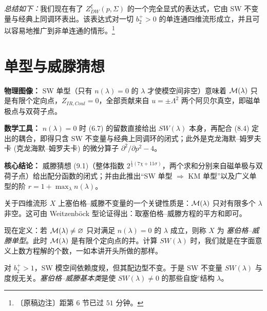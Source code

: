 \emph{总结如下：}我们现在有了 $Z_{DW}^{\xi}(p,\Sigma)$ 的一个完全显式的表达式，它由 SW 不变量与经典上同调环表出。该表达式对一切 $b_2^{+}>0$ 的单连通四维流形成立，并且可以容易地推广到非单连通的情形。\footnote{〔原稿边注〕距第 6 节已过 $51$ 分钟。}

\section{单型与威滕猜想}

\begin{keytakeaways}
\item \textbf{物理图像：} SW 单型（只有 $n(\lambda)=0$ 的 $\lambda$ 才使模空间非空）意味着 $\mathcal{M}(\lambda)$ 只是有限个定向点，$Z_{IR,Coul}=0$，全部贡献来自 $u=\pm\Lambda^{2}$ 两个阿贝尔真空，即磁单极点与双荷子点。
\item \textbf{数学工具：} $n(\lambda)=0$ 时 (6.7) 的留数直接给出 $SW(\lambda)$ 本身，再配合 (8.4) 定出的耦合，即得只含 SW 不变量与经典上同调环的闭式；此外是克龙海默--姆罗夫卡 (克龙海默--姆罗夫卡) 的微分算子 $\partial^{2}/\partial p^{2}-4$。
\item \textbf{核心结论：} 威滕猜想 (9.1)（整体指数 $2^{\frac{1}{4}(7\chi+11\sigma)}$，两个求和分别来自磁单极与双荷子点）给出配分函数的闭式；并由此推出“SW 单型 $\Rightarrow$ KM 单型”以及广义单型的阶 $r=1+\max_{\lambda}n(\lambda)$。
\end{keytakeaways}

关于四维流形 $X$ 上塞伯格--威滕不变量的一个关键性质是：$\mathcal{M}(\lambda)$ 只对有限多个 $\lambda$ 非空。这可由 Weitzenböck 型论证得出：取塞伯格--威滕方程的平方和即可。

现在定义：若 $\mathcal{M}(\lambda)\neq\varnothing$ 只对满足 $n(\lambda)=0$ 的 $\lambda$ 成立，则称 $X$ 为 \emph{塞伯格--威滕单型}。此时 $\mathcal{M}(\lambda)$ 是有限个定向点的并。计算 $SW(\lambda)$ 时，我们就是在字面意义上数方程解的个数，一如本讲开头所做的那样。

对 $b_2^{+}>1$，SW 模空间依赖度规，但其配边型不变。于是 SW 不变量 $SW(\lambda)$ 与度规无关。\emph{塞伯格--威滕基本类}是使 $SW(\lambda)\neq0$ 的那些自旋$^{c}$结构 $\lambda$。

